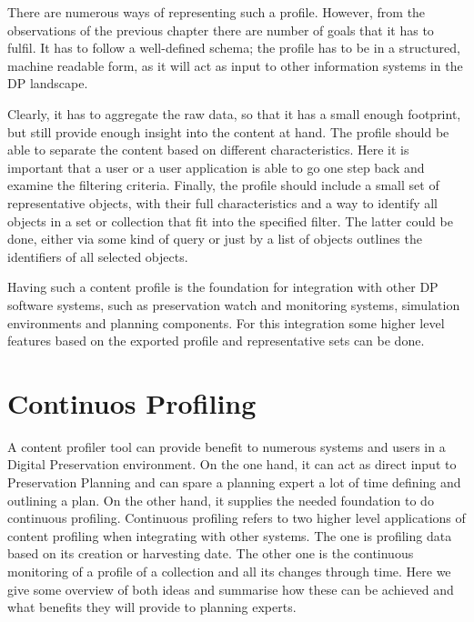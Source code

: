 There are numerous ways of representing such a profile. However, from the observations of the previous chapter there are number of goals that it has to fulfil. It has to follow a well-defined schema; the profile has to be in a structured, machine readable form, as it will act as input to other information systems in the DP landscape.

Clearly, it has to aggregate the raw data, so that it has a small enough footprint, but still provide enough insight into the content at hand. The profile should be able to separate the content based on different characteristics. Here it is important that a user or a user application is able to go one step back and examine the filtering criteria. Finally, the profile should include a small set of representative objects, with their full characteristics and a way to identify all objects in a set or collection that fit into the specified filter. The latter could be done, either via some kind of query or just by a list of objects outlines the identifiers of all selected objects.

Having such a content profile is the foundation for integration with other DP software systems, such as preservation watch and monitoring systems, simulation environments and planning components. For this integration some higher level features based on the exported profile and representative sets can be done.


\section{Continuos Profiling}
A content profiler tool can provide benefit to numerous systems and users in a Digital Preservation environment. On the one hand, it can act as direct input to Preservation Planning and can spare a planning expert a lot of time defining and outlining a plan. On the other hand, it supplies the needed foundation to do continuous profiling. Continuous profiling refers to two higher level applications of content profiling when integrating with other systems. The one is profiling data based on its creation or harvesting date. The other one is the continuous monitoring of a profile of a collection and all its changes through time. Here we give some overview of both ideas and summarise how these can be achieved and what benefits they will provide to planning experts.

